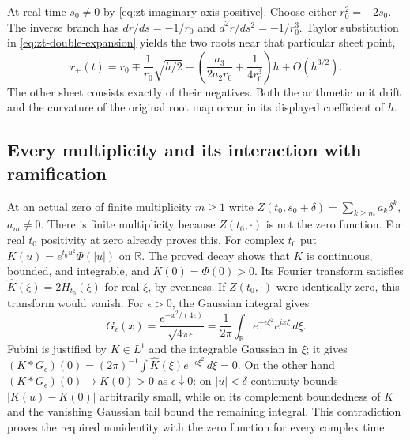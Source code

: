 At real time $s_0\ne0$ by \eqref{eq:zt-imaginary-axis-positive}.
Choose either $r_0^2=-2s_0$.  The inverse branch has
$dr/ds=-1/r_0$ and $d^2r/ds^2=-1/r_0^3$.  Taylor substitution
in \eqref{eq:zt-double-expansion} yields the two roots near that
particular sheet point,
\begin{equation}
 r_\pm(t)=r_0\mathbin\mp\frac1{r_0}\sqrt{h/2}
   -\left(\frac{a_3}{2a_2r_0}+\frac1{4r_0^3}\right)h
   +O(h^{3/2}).
 \label{eq:zt-double-root-expansion}
\end{equation}
The other sheet consists exactly of their negatives.  Both the
arithmetic unit drift and the curvature of the original root map
occur in its displayed coefficient of $h$.

\subsection{Every multiplicity and its interaction with ramification}

At an actual zero of finite multiplicity $m\geq1$ write
$Z(t_0,s_0+\delta)=\sum_{k\geq m}a_k\delta^k$, $a_m\ne0$.
There is finite multiplicity because $Z(t_0,\cdot)$ is not the zero
function.  For real $t_0$ positivity at zero already proves this.
For complex $t_0$ put
$K(u)=e^{t_0u^2}\Phi(|u|)$ on $\mathbb R$.  The proved decay shows
that $K$ is continuous, bounded, and integrable, and $K(0)=\Phi(0)>0$.
Its Fourier transform satisfies
$\widehat K(\xi)=2H_{t_0}(\xi)$ for real $\xi$, by evenness.
If $Z(t_0,\cdot)$ were identically zero, this transform would vanish.
For $\epsilon>0$, the Gaussian integral gives
\[
 G_\epsilon(x)=\frac{e^{-x^2/(4\epsilon)}}{\sqrt{4\pi\epsilon}}
   =\frac1{2\pi}\int_{\mathbb R}e^{-\epsilon\xi^2}e^{ix\xi}\,d\xi.
\]
Fubini is justified by $K\in L^1$ and the integrable Gaussian in
$\xi$; it gives
$(K*G_\epsilon)(0)=(2\pi)^{-1}\int\widehat K(\xi)
e^{-\epsilon\xi^2}\,d\xi=0$.
On the other hand $(K*G_\epsilon)(0)\to K(0)>0$ as
$\epsilon\downarrow0$: on $|u|<\delta$ continuity bounds
$|K(u)-K(0)|$ arbitrarily small, while on its complement boundedness
of $K$ and the vanishing Gaussian tail bound the remaining integral.
This contradiction proves the required nonidentity with the zero
function for every complex time.

